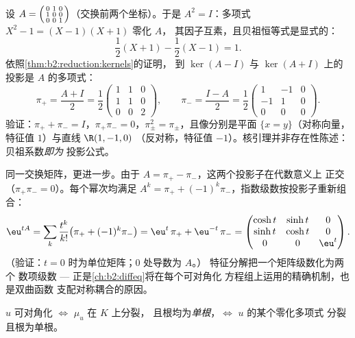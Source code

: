 \begin{example}[显式投影的核引理]\label{ex:b2:reduction:projectorswork}
设 $A = \begin{psmallmatrix}0 & 1 & 0\\ 1 & 0 & 0\\ 0 & 0 &
1\end{psmallmatrix}$（交换前两个坐标）。于是 $A^2
= I$：多项式 $X^2 - 1 = (X - 1)(X + 1)$ 零化 $A$，
其因子互素，且贝祖恒等式是显式的：
\[
\frac{1}{2}(X + 1) - \frac12(X - 1) = 1 .
\]
依照\cref{thm:b2:reduction:kernels}的证明，
到 $\ker(A - I)$ 与 $\ker(A + I)$ 上的投影是
$A$ 的多项式：
\[
\pi_+ = \frac{A + I}{2} = \frac12\begin{pmatrix}
1 & 1 & 0\\ 1 & 1 & 0\\ 0 & 0 & 2\end{pmatrix},
\qquad
\pi_- = \frac{I - A}{2} = \frac12\begin{pmatrix}
1 & -1 & 0\\ -1 & 1 & 0\\ 0 & 0 & 0\end{pmatrix}.
\]
验证：$\pi_+ + \pi_- = I$，$\pi_+\pi_- = 0$，$\pi_\pm^2 =
\pi_\pm$，且像分别是平面 $\{x = y\}$（对称向量，特征值
$1$）与直线 $\R(1, -1, 0)$
（反对称，特征值 $-1$）。核引理并非存在性陈述：
贝祖系数\emph{即为}
投影公式。
\end{example}

\begin{example}[投影子同样可用来计算指数]\label{ex:b2:reduction:expprojectors}
同一交换矩阵，更进一步。由于 $A = \pi_+ -
\pi_-$，这两个投影子在代数意义上
正交（$\pi_+\pi_- = 0$）。每个幂次均满足 $A^k = \pi_+ +
(-1)^k\pi_-$，指数级数按投影子重新组合：
\[
\eu^{tA} = \sum_k \frac{t^k}{k!}\bigl(\pi_+ +
(-1)^k\pi_-\bigr)
= \eu^{t}\,\pi_+ + \eu^{-t}\,\pi_- =
\begin{pmatrix}
\cosh t & \sinh t & 0\\
\sinh t & \cosh t & 0\\
0 & 0 & \eu^{t}
\end{pmatrix}.
\]
（验证：$t = 0$ 时为单位矩阵；$0$ 处导数为 $A$。）
特征分解把一个矩阵级数化为两个
数项级数 --- 正是\cref{ch:b2:diffeq}将在每个可对角化
方程组上运用的精确机制，也是双曲函数
支配对称耦合的原因。
\end{example}

\begin{corollary}[借助极小多项式判定可对角化]\label{cor:b2:reduction:minpolycrit}
$u$ 可对角化 $\iff$ $\mu_u$ 在 $K$ 上分裂，
且根均为\emph{单根}，$\iff$ $u$ 的某个零化多项式
分裂且根为单根。
\end{corollary}

